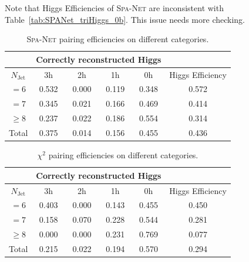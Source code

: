 \documentclass[12pt]{article}
\begin{document}
    Note that Higgs Efficiencies of \textsc{Spa-Net} are inconsistent with Table~\ref{tab:SPANet_triHiggs_0b}. This issue needs more checking.
    \begin{table}[htpb]
        \centering
        \caption{\textsc{Spa-Net} pairing efficiencies on different categories.}
        \label{tab:SPANet_triHiggs_0b_1h2h3h}
        \begin{tabular}{c|cccc|c}
            \multicolumn{1}{l|}{} & \multicolumn{4}{c|}{Correctly reconstructed Higgs} & \multicolumn{1}{l}{} \\ \hline
            $N_\text{Jet}$        & 3h          & 2h         & 1h         & 0h         & Higgs Efficiency     \\ \hline
            $=6$                  & 0.532       & 0.000      & 0.119      & 0.348      & 0.572                \\
            $=7$                  & 0.345       & 0.021      & 0.166      & 0.469      & 0.414                \\
            $\ge 8$               & 0.237       & 0.022      & 0.186      & 0.554      & 0.314                \\ \hline
            Total                 & 0.375       & 0.014      & 0.156      & 0.455      & 0.436
        \end{tabular}
    \end{table}
    \begin{table}[htpb]
        \centering
        \caption{$\chi^2$ pairing efficiencies on different categories.}
        \label{tab:chi2_pairing_triHiggs_0b_1h2h3h}
        \begin{tabular}{c|cccc|c}
            \multicolumn{1}{l|}{} & \multicolumn{4}{c|}{Correctly reconstructed Higgs} & \multicolumn{1}{l}{} \\ \hline
            $N_\text{Jet}$        & 3h          & 2h         & 1h         & 0h         & Higgs Efficiency     \\ \hline
            $=6$                  & 0.403       & 0.000      & 0.143      & 0.455      & 0.450                \\
            $=7$                  & 0.158       & 0.070      & 0.228      & 0.544      & 0.281                \\
            $\ge 8$               & 0.000       & 0.000      & 0.231      & 0.769      & 0.077                \\ \hline
            Total                 & 0.215       & 0.022      & 0.194      & 0.570      & 0.294
        \end{tabular}
    \end{table}
\end{document}
